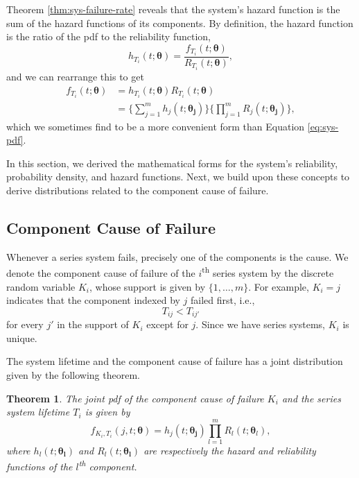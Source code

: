 \documentclass[
]{article}
\theoremstyle{definition}
\theoremstyle{plain}
\newtheorem{theorem}{Theorem}[section]
\theoremstyle{definition}
\theoremstyle{definition}
\theoremstyle{definition}
\theoremstyle{definition}
\theoremstyle{remark}
\begin{document}
Theorem \ref{thm:sys-failure-rate} reveals that the system's hazard function is
the sum of the hazard functions of its components. By definition, the hazard
function is the ratio of the pdf to the reliability function,
\[
h_{T_i}(t;\boldsymbol{\theta}) = \frac{f_{T_i}(t;\boldsymbol{\theta})}{R_{T_i}(t;\boldsymbol{\theta})},
\]
and we can rearrange this to get
\begin{equation}
\label{eq:sys-pdf-2}
\begin{split}
f_{T_i}(t;\boldsymbol{\theta}) &= h_{T_i}(t;\boldsymbol{\theta}) R_{T_i}(t;\boldsymbol{\theta})\\
              &= \biggl\{\sum_{j=1}^m h_j(t;\boldsymbol{\theta_j})\biggr\}
                 \biggl\{ \prod_{j=1}^m R_j(t;\boldsymbol{\theta_j}) \biggr\},
\end{split}
\end{equation}
which we sometimes find to be a more convenient form than Equation
\eqref{eq:sys-pdf}.

In this section, we derived the mathematical forms for the system's reliability,
probability density, and hazard functions. Next, we build upon these concepts to
derive distributions related to the component cause of failure.

\hypertarget{comp-cause}{%
\subsection{Component Cause of Failure}\label{comp-cause}}

Whenever a series system fails, precisely one of the components is the cause.
We denote the component cause of failure of the \(i\)\textsuperscript{th} series
system by the discrete random variable \(K_i\), whose support is given by \(\{1,\ldots,m\}\).
For example, \(K_i=j\) indicates that the component indexed by \(j\) failed first, i.e.,
\[
    T_{i j} < T_{i j'}
\]
for every \(j'\) in the support of \(K_i\) except for \(j\).
Since we have series systems, \(K_i\) is unique.

The system lifetime and the component cause of failure has a joint distribution
given by the following theorem.

\begin{theorem}
\protect\hypertarget{thm:f-k-and-t}{}\label{thm:f-k-and-t}The joint pdf of the component cause of failure \(K_i\) and the series system lifetime
\(T_i\) is given by
\begin{equation}
\label{eq:f-k-and-t}
  f_{K_i,T_i}(j,t;\boldsymbol{\theta}) = h_j(t;\boldsymbol{\theta_j}) \prod_{l=1}^m R_l(t;\boldsymbol{\theta}_l),
\end{equation}
where \(h_l(t;\boldsymbol{\theta_l})\) and \(R_l(t;\boldsymbol{\theta_l})\) are respectively the hazard
and reliability functions of the \(l\)\textsuperscript{th} component.
\end{theorem}
\end{document}
